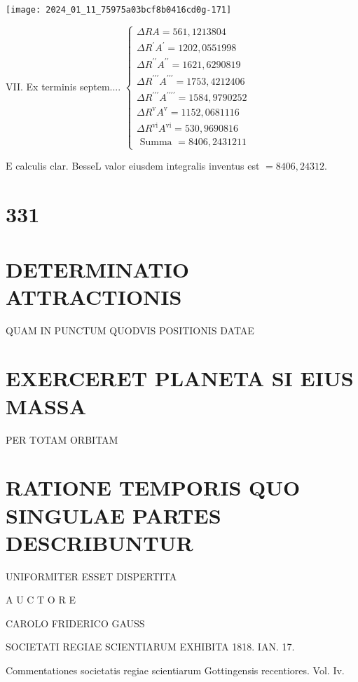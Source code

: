\documentclass[10pt]{article}
\begin{document}
\begin{center}
\texttt{[image: 2024\_01\_11\_75975a03bcf8b0416cd0g-171]}
\end{center}

VII. Ex terminis septem.... \(\left\{\begin{array}{l}\Delta R A=561,1213804 \\ \Delta R^{\prime} A^{\prime}=1202,0551998 \\ \Delta R^{\prime \prime} A^{\prime \prime}=1621,6290819 \\ \Delta R^{\prime \prime \prime} A^{\prime \prime \prime}=1753,4212406 \\ \Delta R^{\prime \prime \prime} A^{\prime \prime \prime \prime}=1584,9790252 \\ \Delta R^{\mathrm{v}} A^{\mathrm{v}}=1152,0681116 \\ \Delta R^{\mathrm{vi}} A^{\mathrm{vi}}=530,9690816 \\ \hline \text { Summa }=8406,2431211\end{array}\right.\)

\(\mathrm{E}\) calculis clar. BesseL valor eiusdem integralis inventus est \(=8406,24312\).

\section*{331}
\section*{DETERMINATIO ATTRACTIONIS}
QUAM IN PUNCTUM QUODVIS POSITIONIS DATAE

\section*{EXERCERET PLANETA SI EIUS MASSA}
PER TOTAM ORBITAM

\section*{RATIONE TEMPORIS QUO SINGULAE PARTES DESCRIBUNTUR}
UNIFORMITER ESSET DISPERTITA

A U C T O R E

CAROLO FRIDERICO GAUSS

SOCIETATI REGIAE SCIENTIARUM EXHIBITA 1818. IAN. 17.

Commentationes societatis regiae scientiarum Gottingensis recentiores. Vol. Iv.
\end{document}
